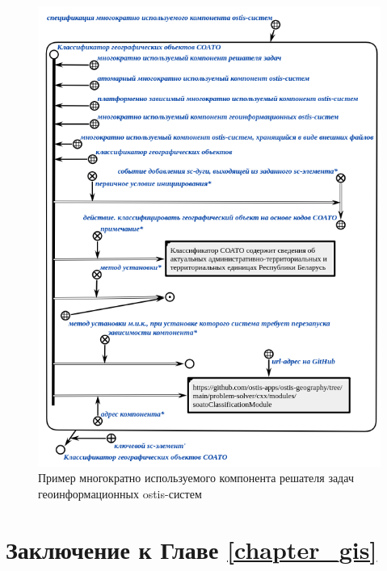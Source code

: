 \begin{figure}[H]
\includegraphics[scale=0.8]{author/part7/figures/gis_ps_component.png}
\caption{Пример многократно используемого компонента решателя задач геоинформационных ostis-систем}
\label{fig:gis_ps_component}
\end{figure}

\section*{Заключение к Главе \ref{chapter_gis}}

